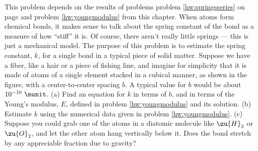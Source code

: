         This problem depends on the results of problems problem \ref{hw:springsseries}
        on page \pageref{hw:springsseries} and
        problem \ref{hw:youngmodulus} from this chapter. When atoms
        form chemical bonds, it makes sense to talk about the spring
        constant of the bond as a measure of how ``stiff'' it is. Of
        course, there aren't really little springs --- this is just a
        mechanical model. The purpose of this problem is to estimate
        the spring constant, $k$, for a single bond in a typical piece
        of solid matter. Suppose we have a fiber, like a hair or a
        piece of fishing line, and imagine for simplicity that it is
        made of atoms of a single element stacked in a cubical
        manner, as shown in the figure, with a center-to-center
        spacing $b$. A typical value for $b$ would be about $10^{-10}\ \munit$.\hwendpart
        (a) Find an equation for $k$ in terms of $b$, and in terms of
        the Young's modulus, $E$, defined in problem \ref{hw:youngmodulus} and its
        solution. \hwendpart
        (b) Estimate $k$ using the numerical data given in
        problem \ref{hw:youngmodulus}. \hwendpart
        (c) Suppose you could grab one of the atoms in a
        diatomic molecule like $\zu{H}_2$ or $\zu{O}_2$, and let the other atom hang
        vertically below it. Does the bond stretch by any
        appreciable fraction due to gravity?
